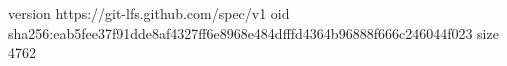 version https://git-lfs.github.com/spec/v1
oid sha256:eab5fee37f91dde8af4327ff6e8968e484dfffd4364b96888f666c246044f023
size 4762
